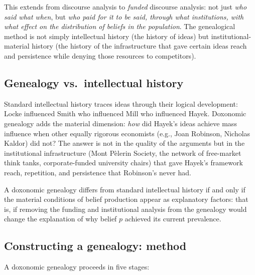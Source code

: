 This extends \textcite{foucault1971} from discourse analysis to \emph{funded} discourse analysis: not just \emph{who said what when}, but \emph{who paid for it to be said, through what institutions, with what effect on the distribution of beliefs in the population}.
The genealogical method is not simply intellectual history (the history of ideas) but institutional-material history (the history of the infrastructure that gave certain ideas reach and persistence while denying those resources to competitors).

\subsection{Genealogy vs.\ intellectual history}

Standard intellectual history traces ideas through their logical development: Locke influenced Smith who influenced Mill who influenced Hayek.
Doxonomic genealogy adds the material dimension: \emph{how} did Hayek's ideas achieve mass influence when other equally rigorous economists (e.g., Joan Robinson, Nicholas Kaldor) did not?
The answer is not in the quality of the arguments but in the institutional infrastructure (Mont P\`{e}lerin Society, the network of free-market think tanks, corporate-funded university chairs) that gave Hayek's framework reach, repetition, and persistence that Robinson's never had.

\begin{proposition}
\label{prop:genealogy-criterion}
A doxonomic genealogy differs from standard intellectual history if and only if the material conditions of belief production appear as explanatory factors: that is, if removing the funding and institutional analysis from the genealogy would change the explanation of why belief $p$ achieved its current prevalence.
\end{proposition}

\subsection{Constructing a genealogy: method}

A doxonomic genealogy proceeds in five stages:

